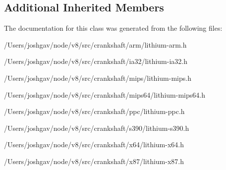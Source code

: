 \subsection*{Additional Inherited Members}


The documentation for this class was generated from the following files\+:\begin{DoxyCompactItemize}
\item 
/\+Users/joshgav/node/v8/src/crankshaft/arm/lithium-\/arm.\+h\item 
/\+Users/joshgav/node/v8/src/crankshaft/ia32/lithium-\/ia32.\+h\item 
/\+Users/joshgav/node/v8/src/crankshaft/mips/lithium-\/mips.\+h\item 
/\+Users/joshgav/node/v8/src/crankshaft/mips64/lithium-\/mips64.\+h\item 
/\+Users/joshgav/node/v8/src/crankshaft/ppc/lithium-\/ppc.\+h\item 
/\+Users/joshgav/node/v8/src/crankshaft/s390/lithium-\/s390.\+h\item 
/\+Users/joshgav/node/v8/src/crankshaft/x64/lithium-\/x64.\+h\item 
/\+Users/joshgav/node/v8/src/crankshaft/x87/lithium-\/x87.\+h\end{DoxyCompactItemize}

